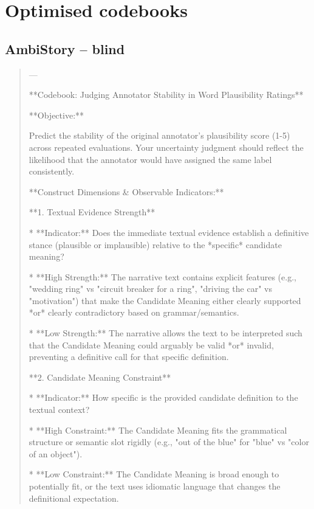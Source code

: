 \section{Optimised codebooks}
\label{app:codebooks}
\subsection*{AmbiStory -- blind}
\begin{quote}\small
---

**Codebook: Judging Annotator Stability in Word Plausibility Ratings**



**Objective:**

Predict the stability of the original annotator's plausibility score (1-5) across repeated evaluations. Your uncertainty judgment should reflect the likelihood that the annotator would have assigned the same label consistently.



**Construct Dimensions \& Observable Indicators:**



**1. Textual Evidence Strength**

*   **Indicator:** Does the immediate textual evidence establish a definitive stance (plausible or implausible) relative to the *specific* candidate meaning?

*   **High Strength:** The narrative text contains explicit features (e.g., "wedding ring" vs "circuit breaker for a ring", "driving the car" vs "motivation") that make the Candidate Meaning either clearly supported *or* clearly contradictory based on grammar/semantics.

*   **Low Strength:** The narrative allows the text to be interpreted such that the Candidate Meaning could arguably be valid *or* invalid, preventing a definitive call for that specific definition.



**2. Candidate Meaning Constraint**

*   **Indicator:** How specific is the provided candidate definition to the textual context?

*   **High Constraint:** The Candidate Meaning fits the grammatical structure or semantic slot rigidly (e.g., "out of the blue" for "blue" vs "color of an object").

*   **Low Constraint:** The Candidate Meaning is broad enough to potentially fit, or the text uses idiomatic language that changes the definitional expectation.




\end{quote}
